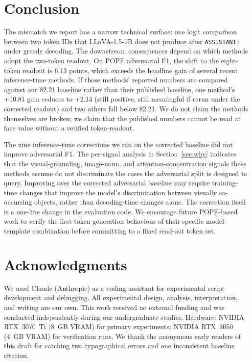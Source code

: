 \documentclass[11pt,letterpaper]{article}
\begin{document}
\section{Conclusion}
\label{sec:conclusion}

The mismatch we report has a narrow technical surface: one logit
comparison between two token IDs that LLaVA-1.5-7B does not produce
after \texttt{ASSISTANT:} under greedy decoding. The downstream
consequences depend on which methods adopt the two-token readout.
On POPE adversarial F1, the shift to the eight-token readout is 6.13
points, which exceeds the headline gain of several recent
inference-time methods. If those methods' reported numbers are
compared against our 82.21 baseline rather than their published
baseline, one method's +10.81 gain reduces to +2.14 (still positive,
still meaningful if rerun under the corrected readout) and two others
fall below 82.21. We do not claim the methods themselves are broken;
we claim that the published numbers cannot be read at face value
without a verified token-readout.

The nine inference-time corrections we ran on the corrected baseline
did not improve adversarial F1. The per-signal analysis in
Section~\ref{sec:why} indicates that the visual-grounding, image-noun,
and attention-concentration signals these methods assume do not
discriminate the cases the adversarial split is designed to query.
Improving over the corrected adversarial baseline may require
training-time changes that improve the model's discrimination between
visually co-occurring objects, rather than decoding-time changes alone.
The correction itself is a one-line change in the evaluation code.
We encourage future POPE-based work to verify the first-token
generation behaviour of their specific model-template combination
before committing to a fixed read-out token set.

\section*{Acknowledgments}
We used Claude (Anthropic) as a coding assistant for experimental
script development and debugging. All experimental design, analysis,
interpretation, and writing are our own. This work received no external
funding and was conducted independently during our undergraduate
studies. Hardware: NVIDIA RTX~3070~Ti (8~GB VRAM) for primary
experiments; NVIDIA RTX~3050 (4~GB VRAM) for verification runs. We
thank the anonymous early readers of this draft for catching two
typographical errors and one inconsistent baseline citation.
\end{document}

